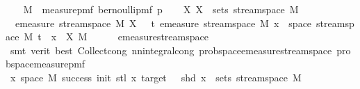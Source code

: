 \begin{isabellebody}
%
\isadelimproof
%
\endisadelimproof
%
\isatagproof
{}\isamarkupfalse%
{\isacharminus}{\kern0pt}\isanewline
\ \ \isamarkupfalse%
\ {\isacharquery}{\kern0pt}M\ {\isacharequal}{\kern0pt}\ {\isachardoublequoteopen}measure{\isacharunderscore}{\kern0pt}pmf\ {\isacharparenleft}{\kern0pt}bernoulli{\isacharunderscore}{\kern0pt}pmf\ p{\isacharparenright}{\kern0pt}{\isachardoublequoteclose}\isanewline
\ \ \isamarkupfalse%
\ {\isachardoublequoteopen}{\isasymAnd}X{\isachardot}{\kern0pt}\ X\ {\isasymin}\ sets\ {\isacharparenleft}{\kern0pt}stream{\isacharunderscore}{\kern0pt}space\ {\isacharquery}{\kern0pt}M{\isacharparenright}{\kern0pt}\ {\isasymLongrightarrow}\isanewline
\ \ emeasure\ {\isacharparenleft}{\kern0pt}stream{\isacharunderscore}{\kern0pt}space\ {\isacharquery}{\kern0pt}M{\isacharparenright}{\kern0pt}\ X\ {\isacharequal}{\kern0pt}\ {\isasymintegral}\isactrlsup {\isacharplus}{\kern0pt}\ t{\isachardot}{\kern0pt}\ emeasure\ {\isacharparenleft}{\kern0pt}stream{\isacharunderscore}{\kern0pt}space\ {\isacharquery}{\kern0pt}M{\isacharparenright}{\kern0pt}\ {\isacharbraceleft}{\kern0pt}x\ {\isasymin}\ space\ {\isacharparenleft}{\kern0pt}stream{\isacharunderscore}{\kern0pt}space\ {\isacharquery}{\kern0pt}M{\isacharparenright}{\kern0pt}{\isachardot}{\kern0pt}\ t\ {\isacharhash}{\kern0pt}{\isacharhash}{\kern0pt}\ x\ {\isasymin}\ X{\isacharbraceright}{\kern0pt}\ {\isasympartial}{\isacharquery}{\kern0pt}M{\isachardoublequoteclose}\isanewline
\ \ \ \ \isamarkupfalse%
\ emeasure{\isacharunderscore}{\kern0pt}stream{\isacharunderscore}{\kern0pt}space\isanewline
\ \ \ \ \isamarkupfalse%
\ {\isacharparenleft}{\kern0pt}smt\ {\isacharparenleft}{\kern0pt}verit{\isacharcomma}{\kern0pt}\ best{\isacharparenright}{\kern0pt}\ Collect{\isacharunderscore}{\kern0pt}cong\ nn{\isacharunderscore}{\kern0pt}integral{\isacharunderscore}{\kern0pt}cong\ prob{\isacharunderscore}{\kern0pt}space{\isachardot}{\kern0pt}emeasure{\isacharunderscore}{\kern0pt}stream{\isacharunderscore}{\kern0pt}space\ prob{\isacharunderscore}{\kern0pt}space{\isacharunderscore}{\kern0pt}measure{\isacharunderscore}{\kern0pt}pmf{\isacharparenright}{\kern0pt}\isanewline
\ \ \isamarkupfalse%
\ \isamarkupfalse%
\ {\isachardoublequoteopen}{\isacharbraceleft}{\kern0pt}x{\isasymin}\ space\ M{\isachardot}{\kern0pt}\ success\ {\isacharparenleft}{\kern0pt}init{\isacharminus}{\kern0pt}{}{\isacharparenright}{\kern0pt}\ {\isacharparenleft}{\kern0pt}stl\ x{\isacharparenright}{\kern0pt}\ target\ {\isasymand}\ {\isasymnot}\ shd\ x{\isacharbraceright}{\kern0pt}\ {\isasymin}\ sets\ {\isacharparenleft}{\kern0pt}stream{\isacharunderscore}{\kern0pt}space\ {\isacharquery}{\kern0pt}M{\isacharparenright}{\kern0pt}{\isachardoublequoteclose}\isanewline

\end{isabellebody}
